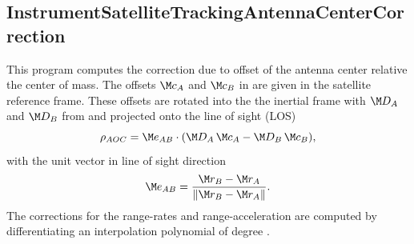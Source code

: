 \clearpage
\subsection{InstrumentSatelliteTrackingAntennaCenterCorrection}\label{InstrumentSatelliteTrackingAntennaCenterCorrection}
This program computes the correction due to offset of the antenna center relative the center of mass.
The offsets $\M c_A$ and $\M c_B$ in  are given in the satellite
reference frame. These offsets are rotated into the the inertial frame with $\M D_A$ and $\M D_B$ from
 and projected onto the line of sight (LOS)
\begin{equation}
  \rho_{AOC} = \M e_{AB}\cdot(\M D_A\,\M c_A - \M D_B\,\M c_B),
\end{equation}
with the unit vector in line of sight direction
\begin{equation}
  \M e_{AB} = \frac{\M r_B - \M r_A}{\left\lVert{\M r_B - \M r_A}\right\rVert}.
\end{equation}
The corrections for the range-rates and range-acceleration are computed by differentiating
an interpolation polynomial of degree .


